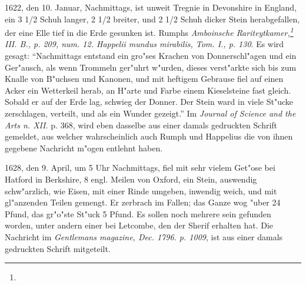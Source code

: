\documentclass[a4paper, 11pt, oneside, polutonikogreek, german]{article}
\begin{document}
1622, den 10. Januar, Nachmittags, ist unweit Tregnie in Devonshire in England, ein 3 1/2 Schuh langer, 2 1/2 breiter, und 2 1/2 Schuh dicker Stein herabgefallen, der eine Elle tief in die Erde gesunken ist. Rumphs \emph{Amboinsche Rariteytkamer,\footnote{} III. B., p. 209, num. 12. Happelii mundus mirabilis, Tom. I., p. 130}. Es wird gesagt: "`Nachmittags entstand ein gro"ses Krachen von Donnerschl"agen und ein Ger"ausch, als wenn Trommeln ger"uhrt w"urden, dieses verst"arkte sich bis zum Knalle von B"uchsen und Kanonen, und mit heftigem Gebrause fiel auf einen Acker ein Wetterkeil herab, an H"arte und Farbe einem Kieselsteine fast gleich. Sobald er auf der Erde lag, schwieg der Donner. Der Stein ward in viele St"ucke zerschlagen, verteilt, und als ein Wunder gezeigt."' Im \emph{Journal of Science and the Arts n. XII.} p. 368, wird eben dasselbe aus einer damals gedruckten Schrift gemeldet, aus welcher wahrscheinlich auch Rumph und Happelius die von ihnen gegebene Nachricht m"ogen entlehnt haben.

1628, den 9. April, um 5 Uhr Nachmittags, fiel mit sehr vielem Get"ose bei Hatford in Berkshire, 8 engl. Meilen von Oxford, ein Stein, auswendig schw"arzlich, wie Eisen, mit einer Rinde umgeben, inwendig weich, und mit gl"anzenden Teilen gemengt. Er zerbrach im Fallen; das Ganze wog "uber 24 Pfund, das gr"o"ste St"uck 5 Pfund. Es sollen noch mehrere sein gefunden worden, unter andern einer bei Letcombe, den der Sherif erhalten hat. Die Nachricht im \emph{Gentlemans magazine, Dec. 1796. p. 1009}, ist aus einer damals gedruckten Schrift mitgeteilt.
\end{document}
